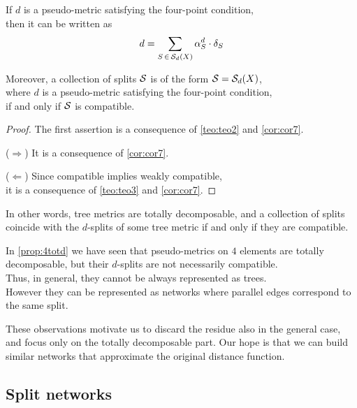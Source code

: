\documentclass[./main.tex]{subfiles}
\begin{document}
\begin{proposition}
    If $d$ is a pseudo-metric satisfying the four-point condition, \\
    \bsp then it can be written as
    \[ d = \sum_{S \,\in\, \Sc_d(X)} \alpha_S^d \cdot \delta_S \nospblw \]
    
    Moreover, a collection of splits ${\mathcal{S}}$ is of the form ${\mathcal{S}} = {\mathcal{S}}_d(X)$, \\
    \bsp where $d$ is a pseudo-metric satisfying the four-point condition, \\
    if and only if ${\mathcal{S}}$ is compatible.
\end{proposition}
\begin{proof}
    The first assertion is a consequence of \autoref{teo:teo2} and \autoref{cor:cor7}.

    ($\Rightarrow$) It is a consequence of \autoref{cor:cor7}.

    ($\Leftarrow$) Since compatible implies weakly compatible, \\
    \Bsp{\qquad} it is a consequence of \autoref{teo:teo3} and \autoref{cor:cor7}.
\end{proof}

In other words, tree metrics are totally decomposable, and a collection of splits coincide with the $d$-splits of some tree metric if and only if they are compatible.

\clearpage

In \autoref{prop:4totd} we have seen that pseudo-metrics on $4$ elements are totally decomposable, but their $d$-splits are not necessarily compatible. \\
Thus, in general, they cannot be always represented as trees. \\
However they can be represented as networks where parallel edges correspond to the same split.

\begin{figure}[h]
    \centering
\end{figure}

These observations motivate us to discard the residue also in the general case, and focus only on the totally decomposable part. Our hope is that we can build similar networks that approximate the original distance function.

\clearpage


\subsection*{Split networks}
\end{document}
